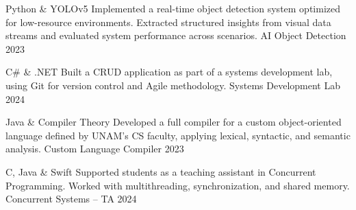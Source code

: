 \begin{cvhonors}

  \cvhonor
    {Python \& YOLOv5}
    {Implemented a real-time object detection system optimized for low-resource environments. Extracted structured insights from visual data streams and evaluated system performance across scenarios.}
    {AI Object Detection}
    {2023}

  \cvhonor
    {C\# \& .NET}
    {Built a CRUD application as part of a systems development lab, using Git for version control and Agile methodology.}
    {Systems Development Lab}
    {2024}

  \cvhonor
    {Java \& Compiler Theory}
    {Developed a full compiler for a custom object-oriented language defined by UNAM’s CS faculty, applying lexical, syntactic, and semantic analysis.}
    {Custom Language Compiler}
    {2023}

  \cvhonor
    {C, Java \& Swift}
    {Supported students as a teaching assistant in Concurrent Programming. Worked with multithreading, synchronization, and shared memory.}
    {Concurrent Systems – TA}
    {2024}

\end{cvhonors}
